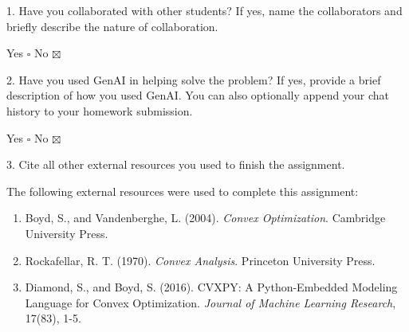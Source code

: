\documentclass[12pt]{article}
\begin{document}
1. Have you collaborated with other students? If yes, name the collaborators and briefly describe the nature of collaboration.

Yes $\square$ \quad No $\boxtimes$

\begin{tcolorbox}
	\vspace{1in}
\end{tcolorbox}

2. Have you used GenAI in helping solve the problem? If yes, provide a brief description of how you used GenAI. You can also optionally append your chat history to your homework submission.

Yes $\square$ \quad No $\boxtimes$

\begin{tcolorbox}
	\vspace{1in}
\end{tcolorbox}

3. Cite all other external resources you used to finish the assignment.

\begin{tcolorbox}
	The following external resources were used to complete this assignment:
	\begin{enumerate}
		\item Boyd, S., and Vandenberghe, L. (2004). \textit{Convex Optimization}. Cambridge University Press.
		\item Rockafellar, R. T. (1970). \textit{Convex Analysis}. Princeton University Press.
		\item Diamond, S., and Boyd, S. (2016). CVXPY: A Python-Embedded Modeling Language for Convex Optimization. \textit{Journal of Machine Learning Research}, 17(83), 1-5.
	\end{enumerate}
\end{tcolorbox}
\end{document}
